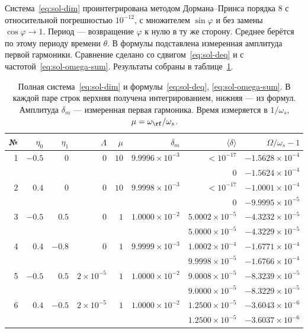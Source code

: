 Система~\eqref{eq:sol-dim} проинтегрирована методом Дормана--Принса порядка 8 с относительной погрешностью $10^{-12}$, с множителем $\sin\varphi$ и без замены $\cos\varphi\to 1$. Период --- возвращение $\varphi$ к нулю в ту же сторону. Среднее берётся по этому периоду времени $\theta$. В формулы подставлена измеренная амплитуда первой гармоники. Сравнение сделано со сдвигом~\eqref{eq:sol-deq} и с частотой~\eqref{eq:sol-omega-sum}. Результаты собраны в таблице~\ref{tab:sol-num}.

\begin{table}[htb]
\caption{Полная система~\eqref{eq:sol-dim} и формулы~\eqref{eq:sol-deq}, \eqref{eq:sol-omega-sum}.
В каждой паре строк верхняя получена интегрированием, нижняя --- из формул.
Амплитуда $\delta_m$ --- измеренная первая гармоника.
Время измеряется в $1/\omega_s$, $\mu=\omega_\rf/\omega_s$.}
\label{tab:sol-num}
\small
\begin{ruledtabular}
\begin{tabular}{rrrrrrrr}
№ & $\eta_0$ & $\eta_1$ & $\Lambda$ & $\mu$ & $\delta_m$
& $\langle\delta\rangle$ & $\Omega/\omega_s-1$ \\
\hline
1 & $-0.5$ & $0$ & $0$ & $10$ & $9.9996\times 10^{-3}$
& $<10^{-17}$ & $-1.5628\times 10^{-4}$ \\
 & & & & &
& $0$ & $-1.5624\times 10^{-4}$ \\
2 & $0.4$ & $0$ & $0$ & $10$ & $9.9998\times 10^{-3}$
& $<10^{-17}$ & $-1.0001\times 10^{-4}$ \\
 & & & & &
& $0$ & $-9.9995\times 10^{-5}$ \\
3 & $-0.5$ & $0.5$ & $0$ & $1$ & $1.0000\times 10^{-2}$
& $5.0002\times 10^{-5}$ & $-4.3232\times 10^{-5}$ \\
 & & & & &
& $5.0000\times 10^{-5}$ & $-4.3229\times 10^{-5}$ \\
4 & $0.4$ & $-0.8$ & $0$ & $1$ & $9.9999\times 10^{-3}$
& $1.0002\times 10^{-4}$ & $-1.6771\times 10^{-4}$ \\
 & & & & &
& $9.9998\times 10^{-5}$ & $-1.6766\times 10^{-4}$ \\
5 & $-0.5$ & $0.5$ & $2\times 10^{-5}$ & $1$ & $1.0000\times 10^{-2}$
& $9.0008\times 10^{-5}$ & $-8.3239\times 10^{-5}$ \\
 & & & & &
& $9.0000\times 10^{-5}$ & $-8.3229\times 10^{-5}$ \\
6 & $0.4$ & $-0.5$ & $2\times 10^{-5}$ & $1$ & $1.0000\times 10^{-2}$
& $1.2500\times 10^{-5}$ & $-3.6043\times 10^{-6}$ \\
 & & & & &
& $1.2500\times 10^{-5}$ & $-3.6037\times 10^{-6}$ \\

\end{tabular}
\end{ruledtabular}
\end{table}
